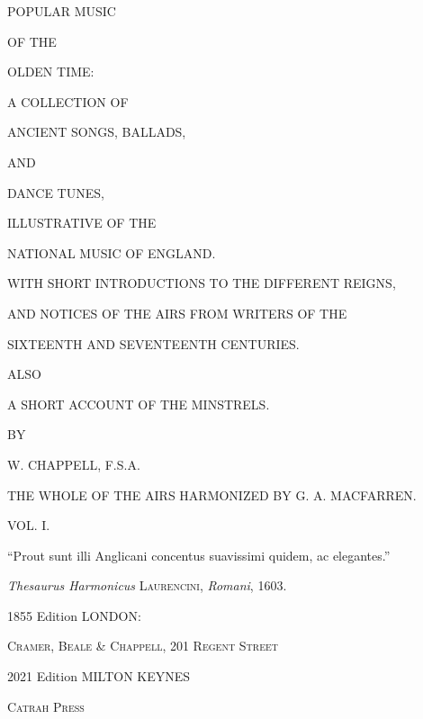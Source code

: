 \thispagestyle{empty}
\begin{center}


\Huge POPULAR MUSIC
\titlespace

\small OF THE

\titlespace

\Huge OLDEN TIME:

\titlespace

\small A COLLECTION OF

\titlespace

\huge ANCIENT SONGS, BALLADS,

\titlespace

\small AND

\titlespace

\huge DANCE TUNES,

\titlespace

\small ILLUSTRATIVE OF THE

\titlespace

\huge NATIONAL MUSIC OF ENGLAND.

\titlespace

\normalsize WITH SHORT INTRODUCTIONS TO THE DIFFERENT REIGNS,

AND NOTICES OF THE AIRS FROM WRITERS OF THE

SIXTEENTH AND SEVENTEENTH CENTURIES.

\titlespace

\small ALSO

\titlespace

\large A SHORT ACCOUNT OF THE MINSTRELS.

\titlespace

\small BY

\titlespace

\Large W. CHAPPELL, F.S.A.

\titlespace

\normalsize THE WHOLE OF THE AIRS HARMONIZED BY G. A. MACFARREN.

\titlespace

\large VOL. I.

\titlespace

\footnotesize “Prout sunt illi Anglicani concentus suavissimi quidem, ac elegantes.”

\textit{Thesaurus Harmonicus} \textsc{Laurencini}, \textit{Romani}, 1603.

\titlespace

\small 1855 Edition LONDON:

\textsc{Cramer, Beale \& Chappell, 201 Regent Street}

\titlespace

2021 Edition MILTON KEYNES

\textsc{Catrah Press}

\normalsize
\vfill
\end{center}
